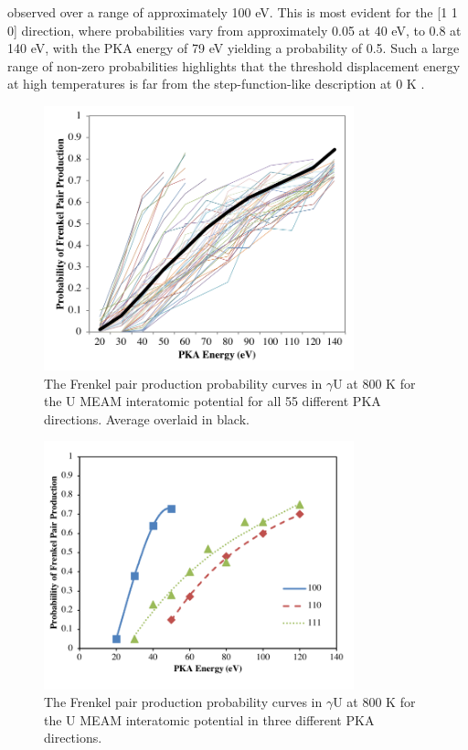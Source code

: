 \documentclass[review]{elsarticle}
\providecommand{\DIFaddbeginFL}{} %
\providecommand{\DIFaddendFL}{} %
\providecommand{\DIFdelbeginFL}{} %
\providecommand{\DIFdelendFL}{} %
\newcommand{\DIFscaledelfig}{0.5}
\newlength{\DIFdelgraphicswidth} %
\newlength{\DIFdelgraphicsheight} %
\newcommand{\DIFaddincludegraphics}[2][]{{\color{blue}\fbox{\DIFOincludegraphics[#1]{#2}}}} %
\newcommand{\DIFdelincludegraphics}[2][]{%
\sbox{\DIFdelgraphicsbox}{\DIFOincludegraphics[#1]{#2}}%
\settoboxwidth{\DIFdelgraphicswidth}{\DIFdelgraphicsbox} %
\settoboxtotalheight{\DIFdelgraphicsheight}{\DIFdelgraphicsbox} %
\scalebox{\DIFscaledelfig}{%
\parbox[b]{\DIFdelgraphicswidth}{\usebox{\DIFdelgraphicsbox}\\[-\baselineskip] \rule{\DIFdelgraphicswidth}{0em}}\llap{\resizebox{\DIFdelgraphicswidth}{\DIFdelgraphicsheight}{%
\setlength{\unitlength}{\DIFdelgraphicswidth}%
\begin{picture}(1,1)%
\thicklines\linethickness{2pt} %
{\color[rgb]{1,0,0}\put(0,0){\framebox(1,1){}}}%
{\color[rgb]{1,0,0}\put(0,0){\line( 1,1){1}}}%
{\color[rgb]{1,0,0}\put(0,1){\line(1,-1){1}}}%
\end{picture}%
}\hspace*{3pt}}} %
} %
\DeclareRobustCommand{\DIFaddbeginFL}{\DIFOaddbeginFL \let\includegraphics\DIFaddincludegraphics} %
\DeclareRobustCommand{\DIFaddendFL}{\DIFOaddendFL \let\includegraphics\DIFOincludegraphics} %
\DeclareRobustCommand{\DIFdelbeginFL}{\DIFOdelbeginFL \let\includegraphics\DIFdelincludegraphics} %
\DeclareRobustCommand{\DIFdelendFL}{\DIFOaddendFL \let\includegraphics\DIFOincludegraphics} %
\begin{document}
observed over a range of approximately 100 eV. This is most evident for the [1 1 0] direction, where probabilities vary from approximately 0.05 at 40 eV, to 0.8 at 140 eV, with the PKA energy of 79 eV yielding a probability of 0.5. Such a large range of non-zero probabilities highlights that the threshold displacement energy at high temperatures is far from the step-function-like description at 0 K \cite{was2007}.

 \begin{figure}[h]
 \centering
 \DIFdelbeginFL %
\DIFdelendFL \DIFaddbeginFL \includegraphics[width=0.8\textwidth]{ed_dir_allD.png} 
 \DIFaddendFL \caption{The Frenkel pair production probability curves in $\gamma$U at 800 K for the U MEAM interatomic potential for all 55 different PKA directions. Average overlaid in black.}
 \label{fig:ed_dirall}
\end{figure}

\begin{figure}[h]
 \centering
 \includegraphics[width=0.8\textwidth]{ed_dirBrev.png} 
 \caption{The Frenkel pair production probability curves in $\gamma$U at 800 K for the U MEAM interatomic potential in three different PKA directions.}
 \label{fig:ed_dir}
\end{figure}
\end{document}
